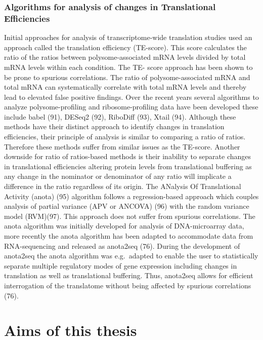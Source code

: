 \documentclass[12pt,openany]{book}
\begin{document}
\subsection{Algorithms for analysis of changes in Translational Efficiencies}

Initial approaches for analysis of transcriptome-wide translation
studies used an approach called the translation efficiency (TE-score).
This score calculates the ratio of the ratios between
polysome-associated mRNA levels divided by total mRNA levels within each
condition. The TE- score approach has been shown to be prone to spurious
correlations. The ratio of polysome-associated mRNA and total mRNA can
systematically correlate with total mRNA levels and thereby lead to
elevated false positive findings. Over the recent years several
algorithms to analyze polysome-profiling and ribosome-profiling data
have been developed these include babel (91), DESeq2 (92), RiboDiff
(93), Xtail (94). Although these methods have their distinct approach to
identify changes in translation efficiencies, their principle of
analysis is similar to comparing a ratio of ratios. Therefore these
methods suffer from similar issues as the TE-score. Another downside for
ratio of ratios-based methods is their inability to separate changes in
translational efficiencies altering protein levels from translational
buffering as any change in the nominator or denominator of any ratio
will implicate a difference in the ratio regardless of its origin. The
ANalysis Of Translational Activity (anota) (95) algorithm follows a
regression-based approach which couples analysis of partial variance
(APV or ANCOVA) (96) with the random variance model (RVM)(97). This
approach does not suffer from spurious correlations. The anota algorithm
was initially developed for analysis of DNA-microarray data, more
recently the anota algorithm has been adapted to accommodate data from
RNA-sequencing and released as anota2seq (76). During the development of
anota2seq the anota algorithm was e.g.~adapted to enable the user to
statistically separate multiple regulatory modes of gene expression
including changes in translation as well as translational buffering.
Thus, anota2seq allows for efficient interrogation of the translatome
without being affected by spurious correlations (76).

\chapter{Aims of this thesis}
\end{document}
